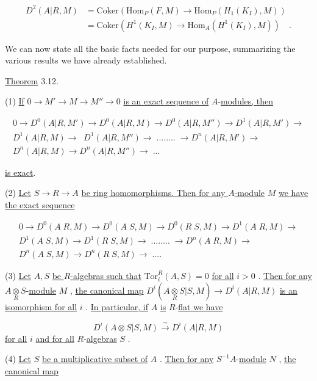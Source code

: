 \begin{align*}
D^2(A|R, M) &= \mathrm{Coker}(\mathrm{Hom}_P(F, M) \to \mathrm{Hom}_P(H_1(K_I), M))\\
&= \mathrm{Coker}(H^1(K_I, M) \to \mathrm{Hom}_A(H^1(K_I), M))\quad .
\end{align*}

We can now state all the basic facts needed for our purpose, summarizing the various results we have already established.




\underline{Theorem} 3.12.

(1)  \underline{If}  $0 \to M' \to M \to M'' \to 0$  \underline{is an exact sequence of} $A$-\underline{modules, then}

\begin{gather*}
0 \to D^0(A|R, M') \to D^0(A|R, M) \to D^0(A|R, M'') \to D^1(A|R, M') \to\\
D^1(A|R, M)\to\;\; D^1(A|R, M'') \to\; ........ \;\to D^n(A|R, M') \to\\
D^n(A|R, M) \to D^n(A|R, M'') \to \;...
\end{gather*}

\underline{is exact}.

(2)  \underline{Let}  $S \to R \to A$  \underline{be ring homomorphisms. Then for any $A$-module}  $M$  \underline{we have the exact sequence}

\begin{gather*}
0 \to D^0(A\;R, M) \to D^0(A\;S, M) \to D^0(R\;S, M) \to D^1(A\;R, M) \to\\
D^1(A\;S, M) \to D^1(R\;S, M) \to\; ........ \;\to D^n(A\;R, M) \to\\
D^n(A\;S, M) \to D^n(R\;S, M) \to \;....
\end{gather*}

(3)  \underline{Let}  $A, S$  \underline{be $R$-algebras such that}  $\mathrm{Tor}_i^R(A, S) = 0$  \underline{for all}  $i > 0$  . \underline{Then for any}  $A\underset{R}{\otimes}S$-\underline{module}  $M$  , \underline{the canonical map}  $D^i(A\underset{R}{\otimes}S|S, M) \to D^i(A|R, M)$  \underline{is an} \underline{isomorphism for all}  $i$  . \underline{In particular, if}  $A$  \underline{is} $R$-\underline{flat we have}

$$D^i(A\otimes S|S, M) \xrightarrow{\sim} D^i(A|R, M)$$
\underline{for all}  $i$  \underline{and for all} $R$-\underline{algebras}  $S$  .

(4)  \underline{Let}  $S$  \underline{be a multiplicative subset of}  $A$  . \underline{Then for any}  $S^{-1}A$-\underline{module} $N$  , \underline{the canonical map}

